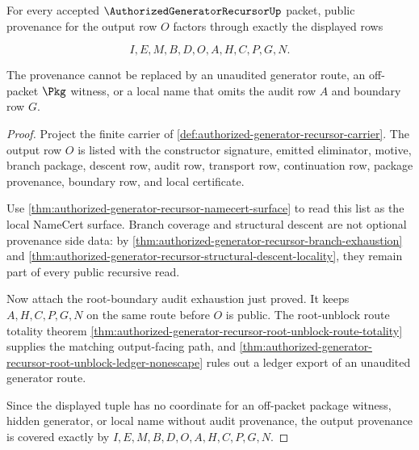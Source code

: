 \begin{theorem}
\label{thm:authorized-generator-recursor-output-provenance-coverage}
For every accepted $\AuthorizedGeneratorRecursorUp$ packet, public provenance for the output row $O$ factors through exactly the displayed rows

$$
I,E,M,B,D,O,A,H,C,P,G,N.
$$

The provenance cannot be replaced by an unaudited generator route, an off-packet $\Pkg$ witness, or a local name that omits the audit row $A$ and boundary row $G$.
\end{theorem}
\begin{proof}
Project the finite carrier of \autoref{def:authorized-generator-recursor-carrier}. The output row $O$ is listed with the constructor signature, emitted eliminator, motive, branch package, descent row, audit row, transport row, continuation row, package provenance, boundary row, and local certificate.

Use \autoref{thm:authorized-generator-recursor-namecert-surface} to read this list as the local NameCert surface. Branch coverage and structural descent are not optional provenance side data: by \autoref{thm:authorized-generator-recursor-branch-exhaustion} and \autoref{thm:authorized-generator-recursor-structural-descent-locality}, they remain part of every public recursive read.

Now attach the root-boundary audit exhaustion just proved. It keeps $A,H,C,P,G,N$ on the same route before $O$ is public. The root-unblock route totality theorem \autoref{thm:authorized-generator-recursor-root-unblock-route-totality} supplies the matching output-facing path, and \autoref{thm:authorized-generator-recursor-root-unblock-ledger-nonescape} rules out a ledger export of an unaudited generator route.

Since the displayed tuple has no coordinate for an off-packet package witness, hidden generator, or local name without audit provenance, the output provenance is covered exactly by $I,E,M,B,D,O,A,H,C,P,G,N$.
\end{proof}

